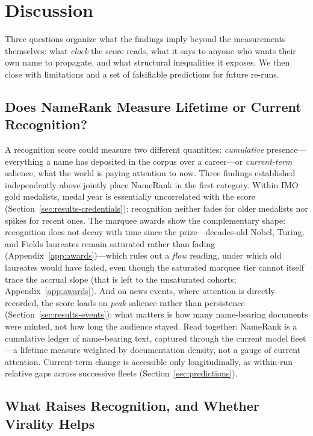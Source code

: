 \documentclass[11pt]{article}
\begin{document}
\section{Discussion}
\label{sec:discussion}

Three questions organize what the findings imply beyond the measurements themselves: what \emph{clock} the score reads, what it says to anyone who wants their own name to propagate, and what structural inequalities it exposes. We then close with limitations and a set of falsifiable predictions for future re-runs.

\subsection{Does NameRank Measure Lifetime or Current Recognition?}
\label{sec:discussion-clock}

A recognition score could measure two different quantities: \emph{cumulative} presence---everything a name has deposited in the corpus over a career---or \emph{current-term} salience, what the world is paying attention to now. Three findings established independently above jointly place NameRank in the first category. Within IMO gold medalists, medal year is essentially uncorrelated with the score (Section~\ref{sec:results-credentials}): recognition neither fades for older medalists nor spikes for recent ones. The marquee awards show the complementary shape: recognition does not decay with time since the prize---decades-old Nobel, Turing, and Fields laureates remain saturated rather than fading (Appendix~\ref{app:awards})---which rules out a \emph{flow} reading, under which old laureates would have faded, even though the saturated marquee tier cannot itself trace the accrual slope (that is left to the unsaturated cohorts; Appendix~\ref{app:awards}). And on news events, where attention is directly recorded, the score loads on \emph{peak} salience rather than persistence (Section~\ref{sec:results-events}): what matters is how many name-bearing documents were minted, not how long the audience stayed. Read together: NameRank is a cumulative ledger of name-bearing text, captured through the current model fleet---a lifetime measure weighted by documentation density, not a gauge of current attention. Current-term change is accessible only longitudinally, as within-run relative gaps across successive fleets (Section~\ref{sec:predictions}).

\subsection{What Raises Recognition, and Whether Virality Helps}
\label{sec:discussion-implications}
\end{document}
